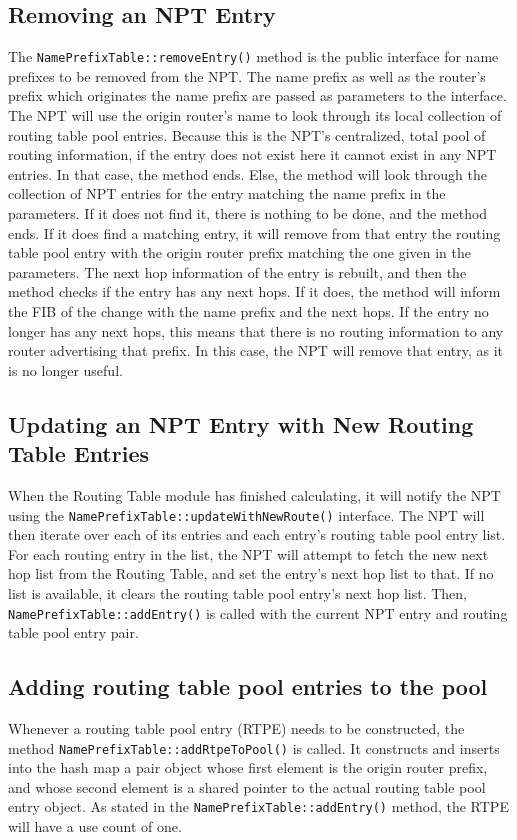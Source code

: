 \subsection{Removing an NPT Entry}
\label{sec:npt-del}
The \texttt{NamePrefixTable::removeEntry()} method is the public interface for name prefixes to be removed from the NPT.
The name prefix as well as the router's prefix which originates the name prefix are passed as parameters to the interface.
The NPT will use the origin router's name to look through its local collection of routing table pool entries.
Because this is the NPT's centralized, total pool of routing information, if the entry does not exist here it cannot exist in any NPT entries.
In that case, the method ends.
Else, the method will look through the collection of NPT entries for the entry matching the name prefix in the parameters.
If it does not find it, there is nothing to be done, and the method ends.
If it does find a matching entry, it will remove from that entry the routing table pool entry with the origin router prefix matching the one given in the parameters.
The next hop information of the entry is rebuilt, and then the method checks if the entry has any next hops.
If it does, the method will inform the FIB of the change with the name prefix and the next hops.
If the entry no longer has any next hops, this means that there is no routing information to any router advertising that prefix.
In this case, the NPT will remove that entry, as it is no longer useful.

\subsection{Updating an NPT Entry with New Routing Table Entries}
\label{sec:npt-update-with-new-route}
When the Routing Table module has finished calculating, it will notify the NPT using the \texttt{NamePrefixTable::updateWithNewRoute()} interface.
The NPT will then iterate over each of its entries and each entry's routing table pool entry list.
For each routing entry in the list, the NPT will attempt to fetch the new next hop list from the Routing Table, and set the entry's next hop list to that.
If no list is available, it clears the routing table pool entry's next hop list.
Then, \texttt{NamePrefixTable::addEntry()} is called with the current NPT entry and routing table pool entry pair.

\subsection{Adding routing table pool entries to the pool}
\label{sec:npt-rtpe-add}
Whenever a routing table pool entry (RTPE) needs to be constructed, the method \texttt{NamePrefixTable::addRtpeToPool()} is called.
It constructs and inserts into the hash map a pair object whose first element is the origin router prefix, and whose second element is a shared pointer to the actual routing table pool entry object.
As stated in the \texttt{NamePrefixTable::addEntry()} method, the RTPE will have a use count of one.


